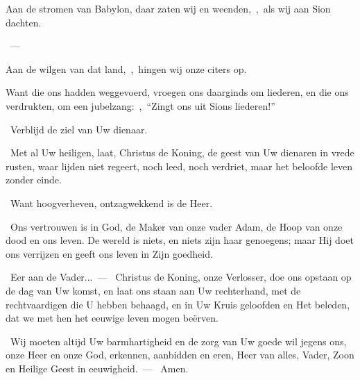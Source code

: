 \documentclass[12pt,twoside,a5paper]{article}
\begin{document}

\begin{halfparskip}
  Aan de stromen van Babylon, daar zaten wij en weenden,~\sep\ als wij aan Sion dachten.

  ~--- 

  Aan de wilgen van dat land,~\sep\ hingen wij onze citers op.

  Want die ons hadden weggevoerd, vroegen ons daarginds om liederen, en die ons verdrukten, om een jubelzang:~\sep\ ``Zingt ons uit Sions liederen!''
\end{halfparskip}

 



\begin{halfparskip}
  \dd~Verblijd de ziel van Uw dienaar.

  \rr~Met al Uw heiligen, laat, Christus de Koning, de geest van Uw dienaren in vrede rusten, waar lijden niet regeert, noch leed, noch verdriet, maar het beloofde leven zonder einde.

  \dd~Want hoogverheven, ontzagwekkend is de Heer.

  \rr~Ons vertrouwen is in God, de Maker van onze vader Adam, de Hoop van onze dood en ons leven. De wereld is niets, en niets zijn haar genoegens; maar Hij doet ons verrijzen en geeft ons leven in Zijn goedheid.

  \cc~Eer aan de Vader...~--- \rr~Christus de Koning, onze Verlosser, doe ons opstaan op de dag van Uw komst, en laat ons staan aan Uw rechterhand, met de rechtvaardigen die U hebben behaagd, en in Uw Kruis geloofden en Het beleden, dat we met hen het eeuwige leven mogen beërven.

  \liturgicalhint{*} \cc~Wij moeten altijd Uw barmhartigheid en de zorg van Uw goede wil jegens ons, onze Heer en onze God, erkennen, aanbidden en eren, Heer van alles, Vader, Zoon en Heilige Geest in eeuwigheid.~--- \rr~Amen.
\end{halfparskip}

\end{document}
